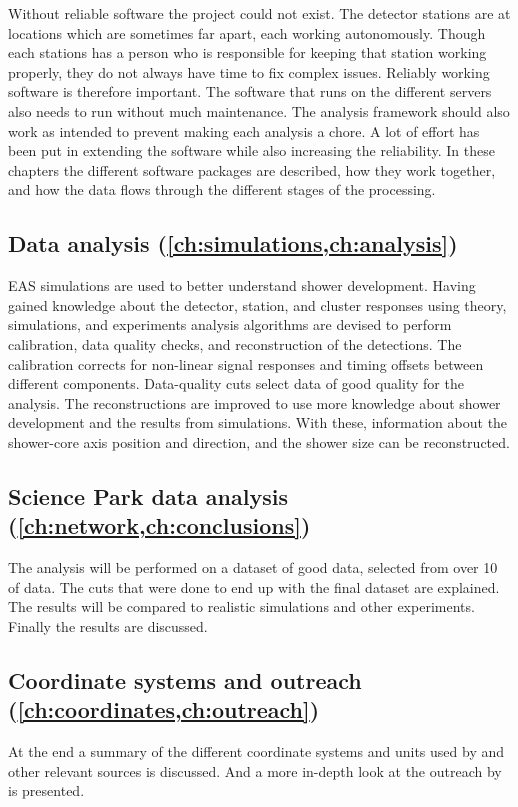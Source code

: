 Without reliable software the \hisparc project could not exist. The detector stations are at locations which are sometimes far apart, each working autonomously. Though each stations has a person who is responsible for keeping that station working properly, they do not always have time to fix complex issues. Reliably working software is therefore important. The software that runs on the different \hisparc servers also needs to run without much maintenance. The analysis framework should also work as intended to prevent making each analysis a chore. A lot of effort has been put in extending the software while also increasing the reliability. In these chapters the different software packages are described, how they work together, and how the data flows through the different stages of the processing.


\subsection{Data analysis
            (\cref{ch:simulations,ch:analysis})}

EAS simulations are used to better understand shower development. Having gained knowledge about the detector, station, and cluster responses using theory, simulations, and experiments analysis algorithms are devised to perform calibration, data quality checks, and reconstruction of the detections. The calibration corrects for non-linear signal responses and timing offsets between different components. Data-quality cuts select data of good quality for the analysis. The reconstructions are improved to use more knowledge about shower development and the results from simulations. With these, information about the shower-core axis position and direction, and the shower size can be reconstructed.


\subsection{Science Park data analysis
            (\cref{ch:network,ch:conclusions})}

The analysis will be performed on a dataset of good data, selected from over \SI{10}{\year} of \hisparc data. The cuts that were done to end up with the final dataset are explained. The results will be compared to realistic simulations and other experiments. Finally the results are discussed.


\subsection{Coordinate systems and outreach 
            (\cref{ch:coordinates,ch:outreach})}

At the end a summary of the different coordinate systems and units used by \hisparc and other relevant sources is discussed. And a more in-depth look at the outreach by \hisparc is presented.
